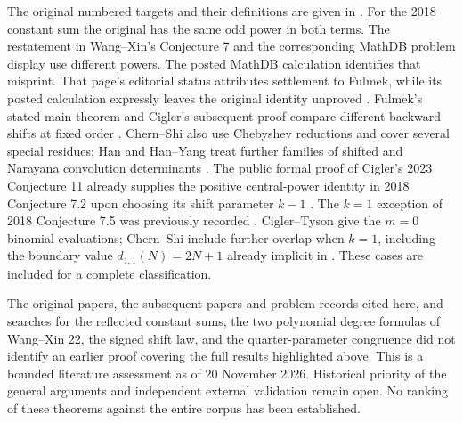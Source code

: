 \documentclass[11pt,a4paper]{article}
\begin{document}
The original numbered targets and their definitions are given in \cite{C18,C23,Sun}. For the 2018 constant sum the original has the same odd power in both terms. The restatement in Wang--Xin's Conjecture 7 and the corresponding MathDB problem display use different powers. The posted MathDB calculation identifies that misprint. That page's editorial status attributes settlement to Fulmek, while its posted calculation expressly leaves the original identity unproved \cite{MathDB}. Fulmek's stated main theorem and Cigler's subsequent proof compare different backward shifts at fixed order \cite{Back}. Chern--Shi also use Chebyshev reductions and cover several special residues; Han and Han--Yang treat further families of shifted and Narayana convolution determinants \cite{CS,Han,HY}. The public formal proof of Cigler's 2023 Conjecture 11 already supplies the positive central-power identity in 2018 Conjecture 7.2 upon choosing its shift parameter $k-1$ \cite{TT}. The $k=1$ exception of 2018 Conjecture 7.5 was previously recorded \cite{TT}. Cigler--Tyson give the $m=0$ binomial evaluations; Chern--Shi include further overlap when $k=1$, including the boundary value $d_{1,1}(N)=2N+1$ already implicit in \cite[Cor.~18]{KY}. These cases are included for a complete classification.

The original papers, the subsequent papers and problem records cited here, and searches for the reflected constant sums, the two polynomial degree formulas of Wang--Xin 22, the signed shift law, and the quarter-parameter congruence did not identify an earlier proof covering the full results highlighted above. This is a bounded literature assessment as of 20 November 2026. Historical priority of the general arguments and independent external validation remain open. No ranking of these theorems against the entire corpus has been established.
\end{document}

